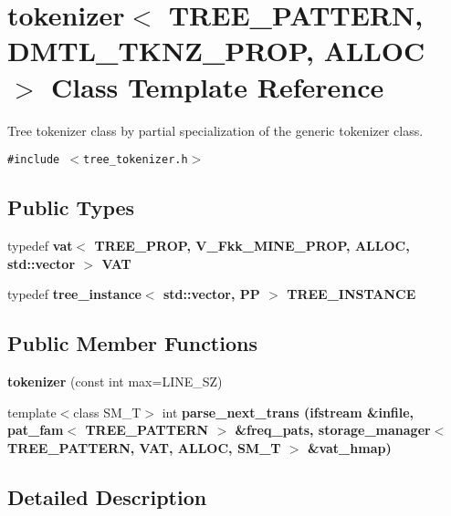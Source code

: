 \section{tokenizer$<$ TREE\_\-PATTERN, DMTL\_\-TKNZ\_\-PROP, ALLOC $>$ Class Template Reference}
\label{classtokenizer_3_01TREE__PATTERN_00_01DMTL__TKNZ__PROP_00_01ALLOC_01_4}
Tree tokenizer class by partial specialization of the generic tokenizer class.  


{\tt \#include $<$tree\_\-tokenizer.h$>$}

\subsection*{Public Types}
\begin{CompactItemize}
\item 
typedef \bf{vat}$<$ TREE\_\-PROP, V\_\-Fkk\_\-MINE\_\-PROP, ALLOC, std::vector $>$ \textbf{VAT}\label{classtokenizer_3_01TREE__PATTERN_00_01DMTL__TKNZ__PROP_00_01ALLOC_01_4_2545f4704b4bcfa54d5a261a9bb951d1}

\item 
typedef \bf{tree\_\-instance}$<$ std::vector, PP $>$ \textbf{TREE\_\-INSTANCE}\label{classtokenizer_3_01TREE__PATTERN_00_01DMTL__TKNZ__PROP_00_01ALLOC_01_4_abef37dda41359954557ee3b6743aa66}

\end{CompactItemize}
\subsection*{Public Member Functions}
\begin{CompactItemize}
\item 
\textbf{tokenizer} (const int max=LINE\_\-SZ)\label{classtokenizer_3_01TREE__PATTERN_00_01DMTL__TKNZ__PROP_00_01ALLOC_01_4_adb68cd593c30907e09ce14b354c495b}

\item 
template$<$class SM\_\-T$>$ int \bf{parse\_\-next\_\-trans} (ifstream \&infile, \bf{pat\_\-fam}$<$ TREE\_\-PATTERN $>$ \&freq\_\-pats, \bf{storage\_\-manager}$<$ TREE\_\-PATTERN, \bf{VAT}, ALLOC, SM\_\-T $>$ \&vat\_\-hmap)
\end{CompactItemize}


\subsection{Detailed Description}
